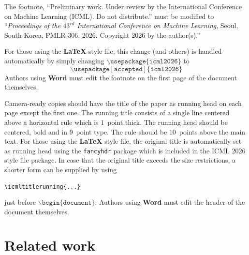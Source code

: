 \documentclass{article}
\theoremstyle{plain}
\theoremstyle{definition}
\theoremstyle{remark}
\begin{document}
The footnote, ``Preliminary work. Under review by the International
Conference on Machine Learning (ICML). Do not distribute.'' must be
modified to ``\textit{Proceedings of the
  $\mathit{43}^{rd}$ International Conference on Machine Learning},
Seoul, South Korea, PMLR 306, 2026.
Copyright 2026 by the author(s).''

For those using the \textbf{\LaTeX} style file, this change (and others) is
handled automatically by simply changing
$\mathtt{\backslash usepackage\{icml2026\}}$ to
$$\mathtt{\backslash usepackage[accepted]\{icml2026\}}$$
Authors using \textbf{Word} must edit the
footnote on the first page of the document themselves.

Camera-ready copies should have the title of the paper as running head
on each page except the first one. The running title consists of a
single line centered above a horizontal rule which is $1$~point thick.
The running head should be centered, bold and in $9$~point type. The
rule should be $10$~points above the main text. For those using the
\textbf{\LaTeX} style file, the original title is automatically set as running
head using the \texttt{fancyhdr} package which is included in the ICML
2026 style file package. In case that the original title exceeds the
size restrictions, a shorter form can be supplied by using

\verb|\icmltitlerunning{...}|

just before $\mathtt{\backslash begin\{document\}}$.
Authors using \textbf{Word} must edit the header of the document themselves.

\fi

\section{Related work}
\end{document}
